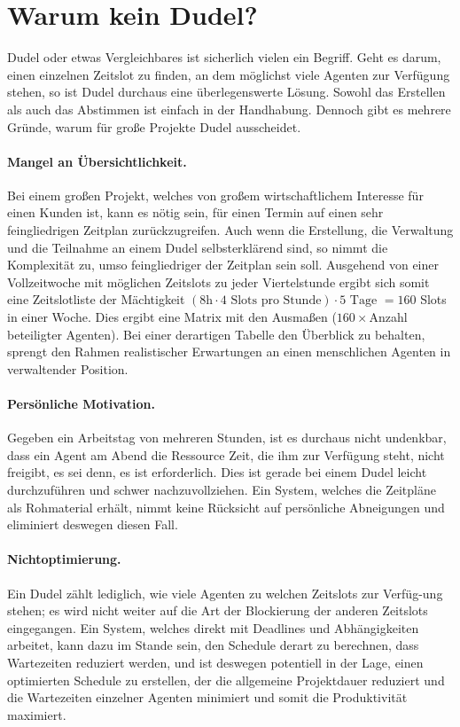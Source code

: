 \documentclass[12pt,twoside]{article}
\theoremstyle{plain}
\theoremstyle{definition}
\theoremstyle{remark}
\begin{document}
\section{Warum kein Dudel?}
\label{sec:dudel}
Dudel oder etwas Vergleichbares ist sicherlich vielen ein Begriff.
Geht es darum, einen einzelnen Zeitslot zu finden, an dem möglichst viele Agenten zur Verfügung stehen, so ist Dudel durchaus eine überlegenswerte Lösung.
Sowohl das Erstellen als auch das Abstimmen ist einfach in der Handhabung.
Dennoch gibt es mehrere Gründe, warum für große Projekte Dudel ausscheidet.
\paragraph{Mangel an Übersichtlichkeit.}
Bei einem großen Projekt, welches von großem wirtschaftlichem Interesse für einen Kunden ist, kann es nötig sein, für einen Termin auf einen sehr feingliedrigen Zeitplan zurückzugreifen.
Auch wenn die Erstellung, die Verwaltung und die Teilnahme an einem Dudel selbsterklärend sind, so nimmt die Komplexität zu, umso feingliedriger der Zeitplan sein soll.
Ausgehend von einer Vollzeitwoche mit möglichen Zeitslots zu jeder Viertelstunde ergibt sich somit eine Zeitslotliste der Mächtigkeit $(8\text{h}\cdot4\text{ Slots pro Stunde})\cdot5\text{ Tage }=160$ Slots in einer Woche.
Dies ergibt eine Matrix mit den Ausmaßen ($160 \times$Anzahl beteiligter Agenten).
Bei einer derartigen Tabelle den Überblick zu behalten, sprengt den Rahmen realistischer Erwartungen an einen menschlichen Agenten in verwaltender Position.
\paragraph{Persönliche Motivation.}
Gegeben ein Arbeitstag von mehreren Stunden, ist es durchaus nicht undenkbar, dass ein Agent am Abend die Ressource Zeit, die ihm zur Verfügung steht, nicht freigibt, es sei denn, es ist erforderlich.
Dies ist gerade bei einem Dudel leicht durchzuführen und schwer nachzuvollziehen.
Ein System, welches die Zeitpläne als Rohmaterial erhält, nimmt keine Rücksicht auf persönliche Abneigungen und eliminiert deswegen diesen Fall.
\paragraph{Nichtoptimierung.}
Ein Dudel zählt lediglich, wie viele Agenten zu welchen Zeitslots zur Verfüg-ung stehen; es wird nicht weiter auf die Art der Blockierung der anderen Zeitslots eingegangen.
Ein System, welches direkt mit Deadlines und Abhängigkeiten arbeitet, kann dazu im Stande sein, den Schedule derart zu berechnen, dass Wartezeiten reduziert werden, und ist deswegen potentiell in der Lage, einen optimierten Schedule zu erstellen, der die allgemeine Projektdauer reduziert und die Wartezeiten einzelner Agenten minimiert und somit die Produktivität maximiert.
\end{document}
